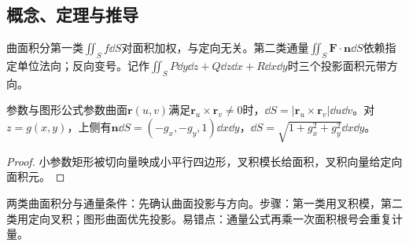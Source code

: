 \subsection{概念、定理与推导}

\begin{definition}{曲面积分}第一类$\iint_Sf\dd S$对面积加权，与定向无关。第二类通量$\iint_S\bm F\cdot\bm n\dd S$依赖指定单位法向；反向变号。记作$\iint_SP\dd y\dd z+Q\dd z\dd x+R\dd x\dd y$时三个投影面积元带方向。\end{definition}
\begin{theorem}{参数与图形公式}参数曲面$\bm r(u,v)$满足$\bm r_u\times\bm r_v\ne0$时，$\dd S=|\bm r_u\times\bm r_v|\dd u\dd v$。对$z=g(x,y)$，上侧有$\bm n\dd S=(-g_x,-g_y,1)\dd x\dd y$，$\dd S=\sqrt{1+g_x^2+g_y^2}\dd x\dd y$。\end{theorem}
\begin{proof}小参数矩形被切向量映成小平行四边形，叉积模长给面积，叉积向量给定向面积元。\end{proof}

\begin{method}{两类曲面积分与通量}条件：先确认曲面投影与方向。步骤：第一类用叉积模，第二类用定向叉积；图形曲面优先投影。易错点：通量公式再乘一次面积根号会重复计量。\end{method}

